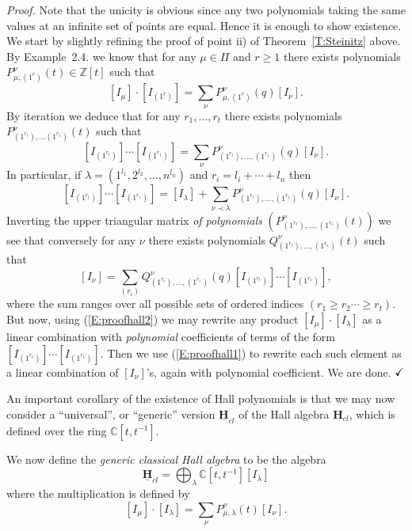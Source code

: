 \documentclass[a4paper,10pt]{amsart}
\def\Z{\mathbb{Z}}
\def\H{\mathbf{H}}
\def\qed{$\hfill \checkmark$}
\def\C{\mathbb{C}}
\numberwithin{equation}{section}
\begin{document}
\noindent
\textit{Proof.} Note that the unicity is obvious since any two polynomials taking the same values at an infinite set of points are equal. Hence it is enough to show existence. We start by slightly refining the proof of point ii) of Theorem~\ref{T:Steinitz} above. By Example~2.4. we know that for any $\mu \in \Pi$ and $r \geq 1$ there exists polynomials $P^{\nu}_{\mu,(1^r)}(t) \in \Z[t]$ such that
$$[I_{\mu}] \cdot [I_{(1^r)}] =\sum_{\nu} P^{\nu}_{\mu,(1^r)}(q) [I_{\nu}].$$
By iteration we deduce that for any $r_1, \ldots, r_t$ there exists polynomials $P^{\nu}_{(1^{r_t}), \ldots (1^{r_1})}(t)$ such that
\begin{equation}\label{E:proofhall1}
[I_{(1^{r_t})}] \cdots [I_{(1^{r_1})}] =\sum_{\nu} P^{\nu}_{(1^{r_t}), \ldots,(1^{r_1})}(q) [I_{\nu}].
\end{equation}
In particular, if $\lambda=(1^{l_1}, 2^{l_2} ,\ldots, n^{l_n})$ and $r_i=l_i + \cdots + l_n$ then
$$[I_{(1^{r_t})}] \cdots [I_{(1^{r_1})}] =[I_{\lambda}] +\sum_{\nu \prec \lambda} P^{\nu}_{(1^{r_t}), \ldots,(1^{r_1})}(q) [I_{\nu}].$$
Inverting the upper triangular matrix \textit{of polynomials} $(P^{\nu}_{(1^{r_t}), \ldots,(1^{r_1})}(t))$ we see that conversely for any $\nu$ there exists polynomials $Q^{\nu}_{(1^{r_t}), \ldots,(1^{r_1})}(t)$ such that
\begin{equation}\label{E:proofhall2}
[I_{\nu}]=\sum_{(r_i)} Q^{\nu}_{(1^{r_t}), \ldots,(1^{r_1})}(q) [I_{(1^{r_t})}] \cdots [I_{(1^{r_1})}] ,
\end{equation}
where the sum ranges over all possible sets of ordered indices $(r_1 \geq r_2 \cdots \geq r_t)$. But now, using (\ref{E:proofhall2}) we may rewrite any product $[I_{\mu}]\cdot [I_{\lambda}]$ as a linear combination with \textit{polynomial} coefficients of terms of the form $[I_{(1^{r_t})}] \cdots [I_{(1^{r_1})}]$. Then we use (\ref{E:proofhall1}) to rewrite each such element as a linear combination of $[I_{\nu}]$'s, again with polynomial coefficient.  We are done. \qed

\vspace{.15in}

An important corollary of the existence of Hall polynomials is that we may now consider a ``universal'', or ``generic'' version $\underline{\H}_{cl}$ of the Hall algebra $\H_{cl}$, which is defined over the ring $\C[t,t^{-1}]$.

\vspace{.1in}

\noindent
We now define the \textit{generic classical Hall algebra} to be the algebra
$$\underline{\H}_{cl}=\bigoplus_{\lambda} \C[t,t^{-1}] [I_{\lambda}]$$
where the multiplication is defined by
$$[I_{\mu}] \cdot [I_{\lambda}]=\sum_{\nu} P^{\nu}_{\mu,\lambda}(t) [I_{\nu}].$$
\end{document}
